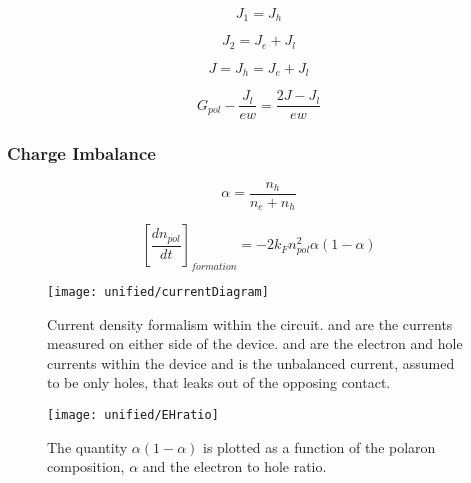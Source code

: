 \documentclass[../thesis.tex]{subfiles}
\begin{document}
\begin{equation}
J_1=J_h
\label{eqn:current_holes_leakage}
\end{equation}

\begin{equation}
J_2=J_e+J_l
\label{eqn:current_electrons_leakage}
\end{equation}

\begin{equation}
J=J_h=J_e+J_l
\label{eqn:current_continuity_leakage}
\end{equation}

\begin{equation}
G_{pol}-\frac{J_l}{ew}=\frac{2J-J_l}{ew}
\label{polaron_generation}
\end{equation}

\subsubsection{Charge Imbalance}

\begin{equation}
\alpha=\frac{n_h}{n_e+n_h}
\label{eqn:charge_ratio}
\end{equation}

\begin{equation}
\left[\frac{dn_{pol}}{dt}\right]_{formation}=-2k_Fn_{pol}^2\alpha(1-\alpha)
\label{eqn:exciton_formation_charge_ratio}
\end{equation}



\begin{figure}[ht]
\centering
\texttt{[image: unified/currentDiagram]}
\caption{Current density formalism within the circuit. and are the currents measured on either side of the device. and are the electron and hole currents within the device and is the unbalanced current, assumed to be only holes, that leaks out of the opposing contact.}
\label{fig:currentDiagram}
\end{figure}

\begin{figure}[ht]
\centering
\texttt{[image: unified/EHratio]}
\caption{The quantity $\alpha(1-\alpha)$ is plotted as a function of the polaron composition, $\alpha$ and the electron to hole ratio.}
\label{fig:EHratio}
\end{figure}

\end{document}
